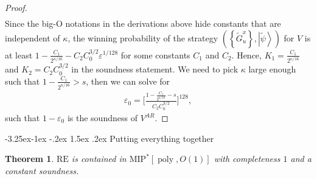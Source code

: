 \documentclass[10pt,a4paper]{article}
\makeatletter
\renewcommand{\subsection}{\@startsection{subsection}{2}{\z@}%
             {-3.25ex\@plus -1ex \@minus -.2ex}%
             {1.5ex \@plus .2ex}%
             {\normalfont\large\scshape\bfseries}}
\theoremstyle{plain}
\newtheorem{theorem}{Theorem}[section]
\theoremstyle{definition}
\newcommand {\set} [1] {\ensuremath{ \left\lbrace #1 \right\rbrace }}
\newcommand {\ket} [1] {\ensuremath{ \left| #1 \right\rangle }}
\newcommand{\poly} {\ensuremath{\operatorname{poly}}}
\newcommand{\ep} {\ensuremath{\varepsilon}}
\newcommand{\1}{\mathbb{1}} %
\newcommand{\tG}{\tilde{G}}
\newcommand{\tpsi}{\tilde{\psi}}
\newcommand{\MIP}{\mathrm{MIP}}
\newcommand{\RE}{\mathrm{RE}}
\makeatother
\begin{document}
\begin{proof}
\begin{align*}
\end{align*}
Since the big-O notations in the derivations above hide constants that are independent of $\kappa$, 
the winning probability of the strategy $(\set{ \tG^x_u }, \ket{\tpsi})$ for $V$ 
is at least $1 -\frac{C_1}{2^{\kappa/16}} - C_2C_0^{3/2}\ep^{1/128}$ for some constants $C_1$ and $C_2$.
Hence, $K_1 = \frac{C_1}{2^{\kappa/16}}$ and $K_2 = C_2C_0^{3/2}$ in the soundness statement.
We need to pick $\kappa$ large enough such that $1 -\frac{C_1}{2^{\kappa/16}} > s$, then we can solve for 
\begin{align*}
    \ep_0 = \Big[\frac{1 - \frac{C_1}{2^{\kappa/16}} - s}{ C_2 C_0^{3/2}}\Big]^{128},
\end{align*}
such that $1 - \ep_0$ is the soundness of $V^{AR}$.
\end{proof}

\subsection{Putting everything together}

\begin{theorem}
    \label{thm:re}
    $\RE$ is contained in $\MIP^\ast[\poly, O(1)]$ with completeness $1$ and a constant soundness. 
\end{theorem}
\end{document}

